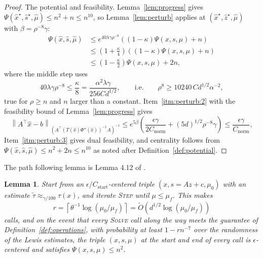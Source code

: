\documentclass[11pt]{article}
\newtheorem{lemma}{Lemma}[section]
\renewcommand{\O}{\widetilde O}
\newcommand{\xhat}{\widehat{x}}
\newcommand{\shat}{\widehat{s}}
\newcommand{\zhat}{\widehat{z}}
\newcommand{\muhat}{\widehat{\mu}}
\newcommand{\tautil}{\widetilde{\tau}}
\newcommand{\Cnorm}{C_{\mathrm{norm}}}
\begin{document}
\begin{proof}
The potential and feasibility.
Lemma~\ref{lem:progress} gives
$\Psi(\xhat^{\star}, \shat^{\star}, \muhat) \le n^{2} + n \le n^{10}$, so
Lemma~\ref{lem:perturb} applies at $(\xhat^{\star}, \zhat^{\star}, \muhat)$ with
$\beta = \rho^{-8} \gamma$:
\[
\begin{aligned}
\Psi(\xhat, \shat, \muhat)
&\le
e^{40 \lambda \gamma \rho^{-8}}
\left( (1 - \kappa) \Psi(x, s, \mu) + n \right)
\\
&\le
\left( 1 + \frac{\kappa}{4} \right)
\left( (1 - \kappa) \Psi(x, s, \mu) + n \right)
\\
&\le
\left( 1 - \frac{\kappa}{2} \right) \Psi(x, s, \mu) + 2 n,
\end{aligned}
\]
where the middle step uses
\[
40 \lambda \gamma \rho^{-8}
\le
\frac{\kappa}{8}
=
\frac{\alpha^{2} \lambda \gamma}{256 C d^{1/2}},
\qquad
\text{i.e.}
\qquad
\rho^{8}
\ge
10240 \, C d^{1/2} \alpha^{-2},
\]
true for $\rho \ge n$ and
$n$ larger than a constant.
Item~\ref{itm:perturb:2} with the feasibility bound of Lemma~\ref{lem:progress}
gives
\[
\left\| A^\top \xhat - b
\right\|_{(A^\top (T(\xhat) \Phi''(\xhat))^{-1} A)^{-1}}
\le
e^{5 \beta} \left( \frac{\epsilon \gamma}{2 \Cnorm}
+ (5 d)^{1/2} \rho^{-8} \gamma \right)
\le
\frac{\epsilon \gamma}{\Cnorm},
\]
Item~\ref{itm:perturb:3} gives dual feasibility, and centrality follows from
$\Psi(\xhat, \shat, \muhat) \le n^{2} + 2 n \le n^{10}$ as noted after
Definition~\ref{def:potential}.
\end{proof}

The path following lemma is Lemma 4.12 of
\cite{BLLSSSW21}.

\begin{lemma}
\label{lem:pathfollowing}
Start from an $\epsilon / C_{\mathrm{start}}$-centered triple
$(x, s = A z + c, \mu_0)$ with an estimate
$\tautil \approx_{\gamma / 100} \tau(x)$, and iterate \textsc{Step} until
$\mu \le \mu_f$.
This makes
\[
r
=
\left\lceil \theta^{-1} \log(\mu_0 / \mu_f) \right\rceil
=
\O\left( d^{1/2} \log(\mu_0 / \mu_f) \right)
\]
calls, and on the event that every \textsc{Solve} call along the way meets the
guarantee of Definition~\ref{def:operations}, with probability at least
$1 - r n^{-7}$ over the randomness of the Lewis estimates, the triple
$(x, s, \mu)$ at the start and end of every call is
$\epsilon$-centered and satisfies
$\Psi(x, s, \mu) \le n^{2}$.
\end{lemma}
\end{document}
